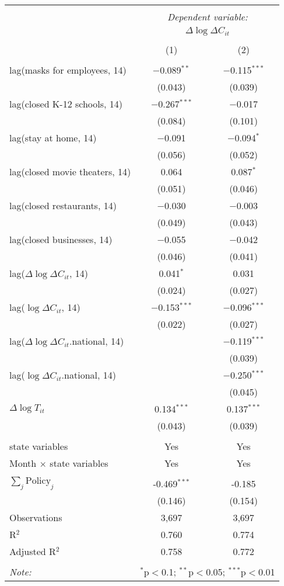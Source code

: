 \begin{tabular}{@{\extracolsep{1pt}}lcc} 
\\[-1.8ex]\hline 
\hline \\[-1.8ex] 
 & \multicolumn{2}{c}{\textit{Dependent variable:}} \\ 
\cline{2-3} 
 & \multicolumn{2}{c}{$\Delta \log \Delta C_{it}$} \\ 
\\[-1.8ex] & (1) & (2)\\ 
\hline \\[-1.8ex] 
 lag(masks for employees, 14) & $-$0.089$^{**}$ & $-$0.115$^{***}$ \\ 
  & (0.043) & (0.039) \\ 
  lag(closed K-12 schools, 14) & $-$0.267$^{***}$ & $-$0.017 \\ 
  & (0.084) & (0.101) \\ 
  lag(stay at home, 14) & $-$0.091 & $-$0.094$^{*}$ \\ 
  & (0.056) & (0.052) \\ 
  lag(closed movie theaters, 14) & 0.064 & 0.087$^{*}$ \\ 
  & (0.051) & (0.046) \\ 
  lag(closed restaurants, 14) & $-$0.030 & $-$0.003 \\ 
  & (0.049) & (0.043) \\ 
  lag(closed businesses, 14) & $-$0.055 & $-$0.042 \\ 
  & (0.046) & (0.041) \\ 
  lag($\Delta \log \Delta C_{it}$, 14) & 0.041$^{*}$ & 0.031 \\ 
  & (0.024) & (0.027) \\ 
  lag($\log \Delta C_{it}$, 14) & $-$0.153$^{***}$ & $-$0.096$^{***}$ \\ 
  & (0.022) & (0.027) \\ 
  lag($\Delta \log \Delta C_{it}$.national, 14) &  & $-$0.119$^{***}$ \\ 
  &  & (0.039) \\ 
  lag($\log \Delta C_{it}$.national, 14) &  & $-$0.250$^{***}$ \\ 
  &  & (0.045) \\ 
  $\Delta \log T_{it}$ & 0.134$^{***}$ & 0.137$^{***}$ \\ 
  & (0.043) & (0.039) \\ 
 \hline \\[-1.8ex] 
state variables & Yes & Yes \\ 
Month $\times$ state variables & Yes & Yes \\ 
\hline \\[-1.8ex] 
$\sum_j \mathrm{Policy}_j$ & -0.469$^{***}$ & -0.185 \\ 
 & (0.146) & (0.154) \\ 
Observations & 3,697 & 3,697 \\ 
R$^{2}$ & 0.760 & 0.774 \\ 
Adjusted R$^{2}$ & 0.758 & 0.772 \\ 
\hline 
\hline \\[-1.8ex] 
\textit{Note:}  & \multicolumn{2}{r}{$^{*}$p$<$0.1; $^{**}$p$<$0.05; $^{***}$p$<$0.01} \\ 
\end{tabular} 